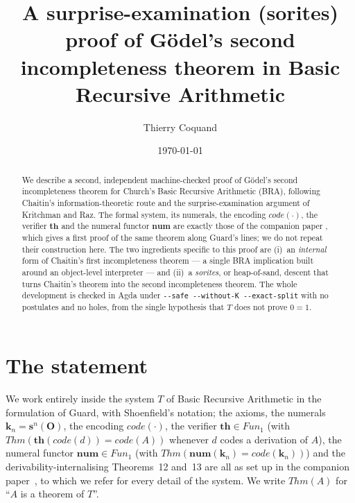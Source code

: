 \documentclass[11pt]{article}
\title{A surprise-examination (sorites) proof of G\"odel's second\\
  incompleteness theorem in Basic Recursive Arithmetic}
\author{Thierry Coquand}
\date{\today}
\theoremstyle{plain}
\theoremstyle{definition}
\theoremstyle{remark}
\newcommand{\code}[1]{\mathit{code}(#1)}
\newcommand{\thmT}{\mathbf{th}}
\newcommand{\num}{\mathbf{num}}
\newcommand{\Fun}{\mathit{Fun}}
\newcommand{\Thm}[1]{\mathit{Thm}(#1)}
\begin{document}
\maketitle

\begin{abstract}
We describe a second, independent machine-checked proof of G\"odel's
second incompleteness theorem for Church's Basic Recursive Arithmetic
(BRA), following Chaitin's information-theoretic route and the
surprise-examination argument of Kritchman and Raz. The formal system,
its numerals, the encoding $\code{\cdot}$, the verifier $\thmT$ and the
numeral functor $\num$ are exactly those of the companion paper
\cite{arGII}, which gives a first proof of the same theorem along
Guard's lines; we do not repeat their construction here. The two
ingredients specific to this proof are (i)~an \emph{internal} form of
Chaitin's first incompleteness theorem --- a single BRA implication
built around an object-level interpreter --- and (ii)~a \emph{sorites},
or heap-of-sand, descent that turns Chaitin's theorem into the second
incompleteness theorem. The whole development is checked in Agda under
\texttt{-{}-safe -{}-without-K -{}-exact-split} with no postulates and no
holes, from the single hypothesis that $T$ does not prove $0=1$.
\end{abstract}

\section{The statement}

We work entirely inside the system $T$ of Basic Recursive Arithmetic in
the formulation of Guard, with Shoenfield's notation; the axioms, the
numerals $\mathbf{k}_n = \mathbf{s}^n(\mathbf{O})$, the encoding
$\code{\cdot}$, the verifier $\thmT \in \Fun_1$ (with
$\Thm{\thmT(\code{d}) = \code{A}}$ whenever $d$ codes a derivation of
$A$), the numeral functor $\num \in \Fun_1$ (with
$\Thm{\num(\mathbf{k}_n) = \code{\mathbf{k}_n}}$) and the
derivability-internalising Theorems~12 and~13 are all as set up in the
companion paper~\cite{arGII}, to which we refer for every detail of the
system. We write $\Thm{A}$ for ``$A$ is a
theorem of $T$''.
\end{document}
